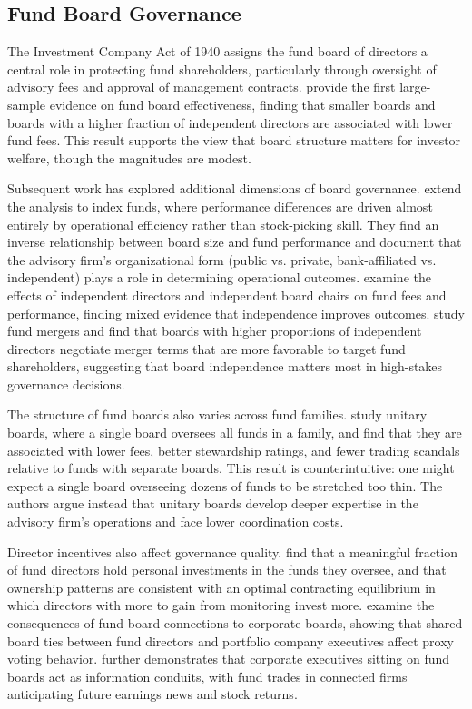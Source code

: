 \documentclass[hidelinks,12pt]{article}
\begin{document}
\subsection{Fund Board Governance}

The Investment Company Act of 1940 assigns the fund board of directors a central role in protecting fund shareholders, particularly through oversight of advisory fees and approval of management contracts. \citet{tufano1997board} provide the first large-sample evidence on fund board effectiveness, finding that smaller boards and boards with a higher fraction of independent directors are associated with lower fund fees. This result supports the view that board structure matters for investor welfare, though the magnitudes are modest.

Subsequent work has explored additional dimensions of board governance. \citet{adams2010internal} extend the analysis to index funds, where performance differences are driven almost entirely by operational efficiency rather than stock-picking skill. They find an inverse relationship between board size and fund performance and document that the advisory firm's organizational form (public vs. private, bank-affiliated vs. independent) plays a role in determining operational outcomes. \citet{ferris2007directors} examine the effects of independent directors and independent board chairs on fund fees and performance, finding mixed evidence that independence improves outcomes. \citet{khorana2007board} study fund mergers and find that boards with higher proportions of independent directors negotiate merger terms that are more favorable to target fund shareholders, suggesting that board independence matters most in high-stakes governance decisions.

The structure of fund boards also varies across fund families. \citet{kong2008unitary} study unitary boards, where a single board oversees all funds in a family, and find that they are associated with lower fees, better stewardship ratings, and fewer trading scandals relative to funds with separate boards. This result is counterintuitive: one might expect a single board overseeing dozens of funds to be stretched too thin. The authors argue instead that unitary boards develop deeper expertise in the advisory firm's operations and face lower coordination costs.

Director incentives also affect governance quality. \citet{chen2008directors} find that a meaningful fraction of fund directors hold personal investments in the funds they oversee, and that ownership patterns are consistent with an optimal contracting equilibrium in which directors with more to gain from monitoring invest more. \citet{calluzzo2019board} examine the consequences of fund board connections to corporate boards, showing that shared board ties between fund directors and portfolio company executives affect proxy voting behavior. \citet{calluzzo2023experts} further demonstrates that corporate executives sitting on fund boards act as information conduits, with fund trades in connected firms anticipating future earnings news and stock returns.
\end{document}
